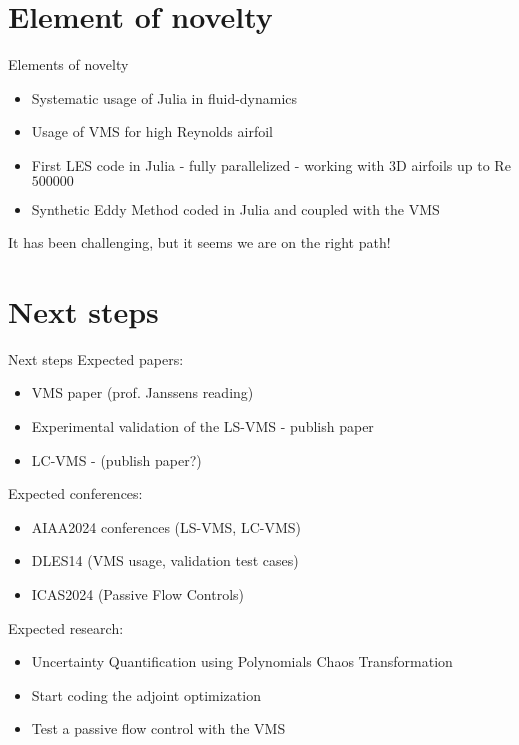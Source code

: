 \documentclass{beamer}
\begin{document}
\section{Element of novelty}
\begin{frame}{Elements of novelty}
\begin{itemize}
	\item Systematic usage of Julia in fluid-dynamics
	\item Usage of VMS for high Reynolds airfoil
	\item First LES code in Julia - fully parallelized - working with 3D airfoils up to Re $\num{500000}$ 
	\item Synthetic Eddy Method coded in Julia and coupled with the VMS
\end{itemize}

It has been challenging, but it seems we are on the right path!

\end{frame}

\section{Next steps}
\begin{frame}{Next steps}
Expected papers:
\begin{itemize}
	\item VMS paper (prof. Janssens reading)
	\item Experimental validation of the LS-VMS - publish paper
	\item LC-VMS - (publish paper?)
\end{itemize}

Expected conferences:
\begin{itemize}
	\item AIAA2024 conferences (LS-VMS, LC-VMS)
	\item DLES14 (VMS usage, validation test cases)
	\item ICAS2024 (Passive Flow Controls)
\end{itemize}


Expected research:
\begin{itemize}
	\item Uncertainty Quantification using Polynomials Chaos Transformation
	\item Start coding the adjoint optimization
	\item Test a passive flow control with the VMS
\end{itemize}

\end{frame}
\end{document}
